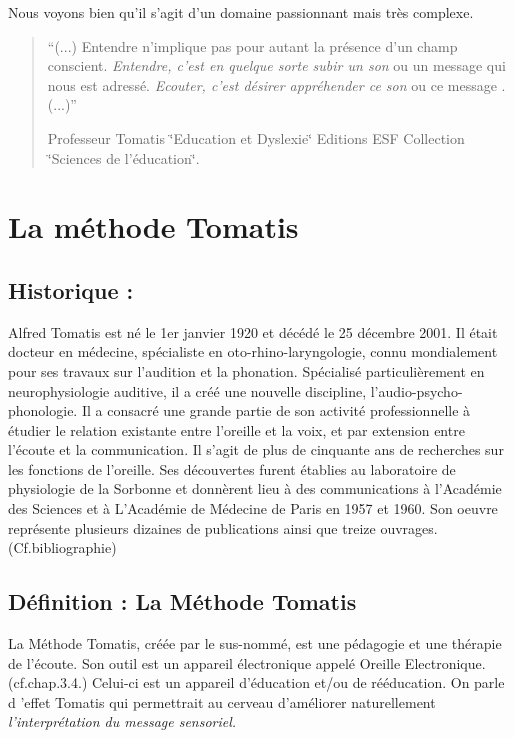 \documentclass[12pt,french]{report}
\makeatletter
\let\SF@@footnote\footnote
\def\footnote{\ifx\protect\@typeset@protect
    \expandafter\SF@@footnote
  \else
    \expandafter\SF@gobble@opt
  \fi
}
\edef\SF@gobble@opt{\noexpand\protect
  \expandafter\noexpand\csname SF@gobble@opt \endcsname}
\makeatother
\begin{document}
Nous voyons bien qu'il s'agit d'un domaine passionnant mais très complexe.
\begin{quote}
``(...) Entendre n'implique pas pour autant la présence d'un champ
conscient.\emph{ Entendre, c\textquoteright est en quelque sorte subir
un son }ou un message qui nous est adressé. \emph{Ecouter, c'est désirer
appréhender ce son }ou ce message . (...)'' 

\footnote{Professeur Tomatis \char`\"{}Education et Dyslexie\char`\"{} Editions
ESF Collection \char`\"{}Sciences de l'éducation\char`\"{}.}
\end{quote}

\chapter{La méthode Tomatis}

\section{Historique :}

Alfred Tomatis est né le 1er janvier 1920 et décédé le 25 décembre
2001. Il était docteur en médecine, spécialiste en oto-rhino-laryngologie,
connu mondialement pour ses travaux sur l'audition et la phonation.
Spécialisé particulièrement en neurophysiologie auditive, il a créé
une nouvelle discipline, l'audio-psycho-phonologie. Il a consacré
une grande partie de son activité professionnelle à étudier le relation
existante entre l'oreille et la voix, et par extension entre l'écoute
et la communication. Il s'agit de plus de cinquante ans de recherches
sur les fonctions de l'oreille. Ses découvertes furent établies au
laboratoire de physiologie de la Sorbonne et donnèrent lieu à des
communications à l'Académie des Sciences et à L'Académie de Médecine
de Paris en 1957 et 1960. Son oeuvre représente plusieurs dizaines
de publications ainsi que treize ouvrages. (Cf.bibliographie)

\section{Définition : La Méthode Tomatis}

La Méthode Tomatis, créée par le sus-nommé, est une pédagogie et une
thérapie de l'écoute. Son outil est un appareil électronique appelé
Oreille Electronique. (cf.chap.3.4.) Celui-ci est un appareil d'éducation
et/ou de rééducation. On parle d 'effet Tomatis qui permettrait au
cerveau d'améliorer naturellement \emph{l'interprétation du message
sensoriel.}
\end{document}
